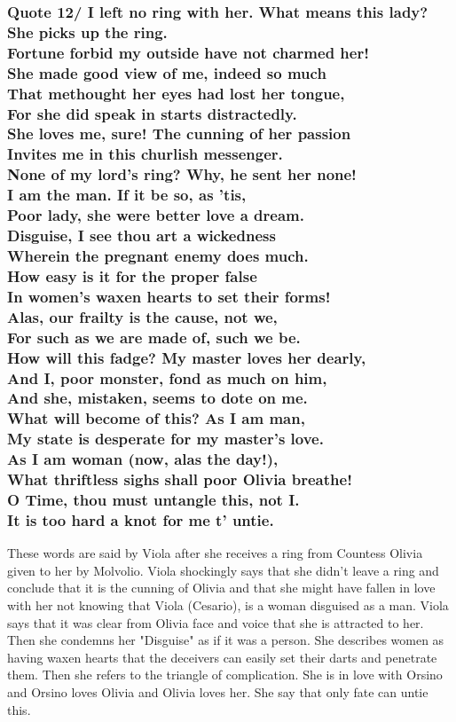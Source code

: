 \documentclass[12pt, a4paper]{article}
\begin{document}
\subsubsection*{Quote 12/
I left no ring with her. What means this lady?\\
She picks up the ring.\\
Fortune forbid my outside have not charmed her!\\
She made good view of me, indeed so much\\
That methought her eyes had lost her tongue,\\
For she did speak in starts distractedly.\\
She loves me, sure! The cunning of her passion\\
Invites me in this churlish messenger.\\
None of my lord’s ring? Why, he sent her none!\\
I am the man. If it be so, as ’tis,\\
Poor lady, she were better love a dream.\\
Disguise, I see thou art a wickedness\\
Wherein the pregnant enemy does much.\\
How easy is it for the proper false\\
In women’s waxen hearts to set their forms!\\
Alas, our frailty is the cause, not we,\\
For such as we are made of, such we be.\\
How will this fadge? My master loves her dearly,\\
And I, poor monster, fond as much on him,\\
And she, mistaken, seems to dote on me.\\
What will become of this? As I am man,\\
My state is desperate for my master’s love.\\
As I am woman (now, alas the day!),\\
What thriftless sighs shall poor Olivia breathe!\\
O Time, thou must untangle this, not I.\\
It is too hard a knot for me t’ untie.
}

These words are said by Viola after she receives a ring from Countess 
Olivia given to her by Molvolio. Viola shockingly says that she didn't leave 
a ring and conclude that it is the cunning of Olivia and that she 
might have fallen in love with her not knowing that Viola (Cesario),
is a woman disguised as a man. Viola says that it was clear from Olivia 
face and voice that she is attracted to her. Then she condemns her
"Disguise" as if it was a person. She describes women as having waxen
hearts that the deceivers can easily set their darts and penetrate them.
Then she refers to the triangle of complication. She is in love with
Orsino and Orsino loves Olivia and Olivia loves her. She say that 
only fate can untie this.\medbreak
\end{document}
